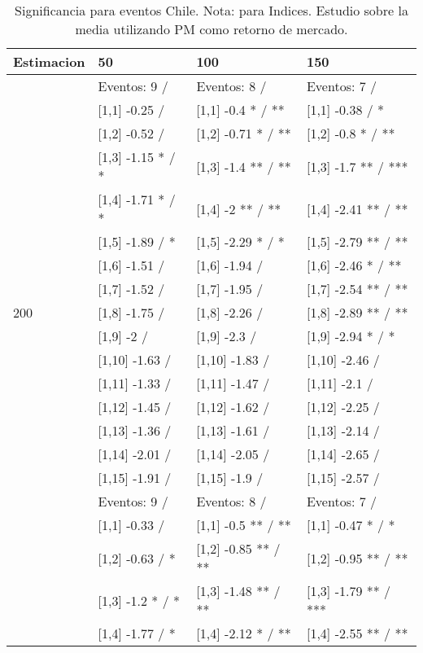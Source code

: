 \begin{table}

\caption{Significancia para eventos Chile. Nota: para Indices. Estudio sobre la media utilizando PM como retorno de mercado.}
\centering
\begin{tabular}[t]{llll}
\toprule
Estimacion & 50 & 100 & 150\\
\midrule
 & Eventos:  9 / & Eventos:  8 / & Eventos:  7 /\\
 & {}[1,1] -0.25  / & {}[1,1] -0.4 * / ** & {}[1,1] -0.38  / *\\
 & {}[1,2] -0.52  / & {}[1,2] -0.71 * / ** & {}[1,2] -0.8 * / **\\
 & {}[1,3] -1.15 * / * & {}[1,3] -1.4 ** / ** & {}[1,3] -1.7 ** / ***\\
 & {}[1,4] -1.71 * / * & {}[1,4] -2 ** / ** & {}[1,4] -2.41 ** / **\\
\addlinespace
 & {}[1,5] -1.89  / * & {}[1,5] -2.29 * / * & {}[1,5] -2.79 ** / **\\
 & {}[1,6] -1.51  / & {}[1,6] -1.94  / & {}[1,6] -2.46 * / **\\
 & {}[1,7] -1.52  / & {}[1,7] -1.95  / & {}[1,7] -2.54 ** / **\\
200 & {}[1,8] -1.75  / & {}[1,8] -2.26  / & {}[1,8] -2.89 ** / **\\
 & {}[1,9] -2  / & {}[1,9] -2.3  / & {}[1,9] -2.94 * / *\\
\addlinespace
 & {}[1,10] -1.63  / & {}[1,10] -1.83  / & {}[1,10] -2.46  /\\
 & {}[1,11] -1.33  / & {}[1,11] -1.47  / & {}[1,11] -2.1  /\\
 & {}[1,12] -1.45  / & {}[1,12] -1.62  / & {}[1,12] -2.25  /\\
 & {}[1,13] -1.36  / & {}[1,13] -1.61  / & {}[1,13] -2.14  /\\
 & {}[1,14] -2.01  / & {}[1,14] -2.05  / & {}[1,14] -2.65  /\\
\addlinespace
 & {}[1,15] -1.91  / & {}[1,15] -1.9  / & {}[1,15] -2.57  /\\
 & Eventos:  9 / & Eventos:  8 / & Eventos:  7 /\\
 & {}[1,1] -0.33  / & {}[1,1] -0.5 ** / ** & {}[1,1] -0.47 * / *\\
 & {}[1,2] -0.63  / * & {}[1,2] -0.85 ** / ** & {}[1,2] -0.95 ** / **\\
 & {}[1,3] -1.2 * / * & {}[1,3] -1.48 ** / ** & {}[1,3] -1.79 ** / ***\\
\addlinespace
 & {}[1,4] -1.77  / * & {}[1,4] -2.12 * / ** & {}[1,4] -2.55 ** / **\\

\end{tabular}
\end{table}
